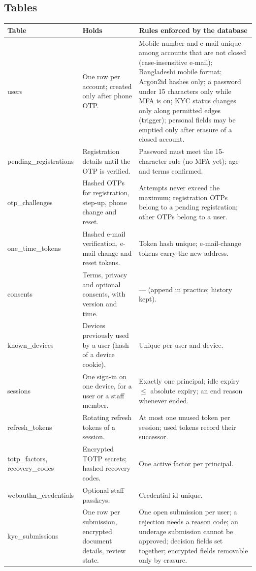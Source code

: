 \documentclass[11pt,a4paper]{article}
\newenvironment{dtable}[1]{\small\begin{longtable}{#1}}{\end{longtable}}
\begin{document}
\subsection{Tables}
\begin{dtable}{@{}>{\ttfamily\raggedright\arraybackslash}p{3.6cm}>{\raggedright\arraybackslash}p{5.2cm}>{\raggedright\arraybackslash}p{6.4cm}@{}}
\toprule
\textnormal{\textbf{Table}} & \textbf{Holds} & \textbf{Rules enforced by the database} \\ \midrule \endhead
users & One row per account; created only after phone OTP. & Mobile number and e-mail unique among accounts that are not closed (case-insensitive e-mail); Bangladeshi mobile format; Argon2id hashes only; a password under 15 characters only while MFA is on; KYC status changes only along permitted edges (trigger); personal fields may be emptied only after erasure of a closed account. \\
pending\_registrations & Registration details until the OTP is verified. & Password must meet the 15-character rule (no MFA yet); age and terms confirmed. \\
otp\_challenges & Hashed OTPs for registration, step-up, phone change and reset. & Attempts never exceed the maximum; registration OTPs belong to a pending registration; other OTPs belong to a user. \\
one\_time\_tokens & Hashed e-mail verification, e-mail change and reset tokens. & Token hash unique; e-mail-change tokens carry the new address. \\
consents & Terms, privacy and optional consents, with version and time. & --- (append in practice; history kept). \\
known\_devices & Devices previously used by a user (hash of a device cookie). & Unique per user and device. \\
sessions & One sign-in on one device, for a user or a staff member. & Exactly one principal; idle expiry $\le$ absolute expiry; an end reason whenever ended. \\
refresh\_tokens & Rotating refresh tokens of a session. & At most one unused token per session; used tokens record their successor. \\
totp\_factors, recovery\_codes & Encrypted TOTP secrets; hashed recovery codes. & One active factor per principal. \\
webauthn\_credentials & Optional staff passkeys. & Credential id unique. \\
kyc\_submissions & One row per submission, encrypted document details, review state. & One open submission per user; a rejection needs a reason code; an underage submission cannot be approved; decision fields set together; encrypted fields removable only by erasure. \\

\end{dtable}
\end{document}
